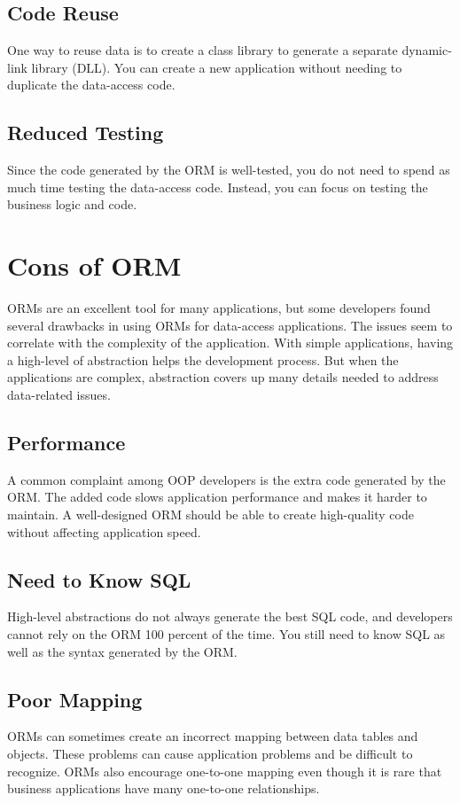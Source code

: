 \documentclass[10pt,a4paper,twoside]{article}
\begin{document}
\subsection{Code Reuse}
\item One way to reuse data is to create a class library to generate a separate dynamic-link library (DLL). You can create a new application without needing to duplicate the data-access code.
\subsection{Reduced Testing}
\item Since the code generated by the ORM is well-tested, you do not need to spend as much time testing the data-access code. Instead, you can focus on testing the business logic and code.


\section{Cons of ORM}
\item ORMs are an excellent tool for many applications, but some developers found several drawbacks in using ORMs for data-access applications. The issues seem to correlate with the complexity of the application. With simple applications, having a high-level of abstraction helps the development process. But when the applications are complex, abstraction covers up many details needed to address data-related issues.
\subsection{Performance}
\item A common complaint among OOP developers is the extra code generated by the ORM. The added code slows application performance and makes it harder to maintain. A well-designed ORM should be able to create high-quality code without affecting application speed.
\subsection{Need to Know SQL}
\item High-level abstractions do not always generate the best SQL code, and developers cannot rely on the ORM 100 percent of the time. You still need to know SQL as well as the syntax generated by the ORM.
\subsection{Poor Mapping}
\item ORMs can sometimes create an incorrect mapping between data tables and objects. These problems can cause application problems and be difficult to recognize. ORMs also encourage one-to-one mapping even though it is rare that business applications have many one-to-one relationships.
\end{document}
